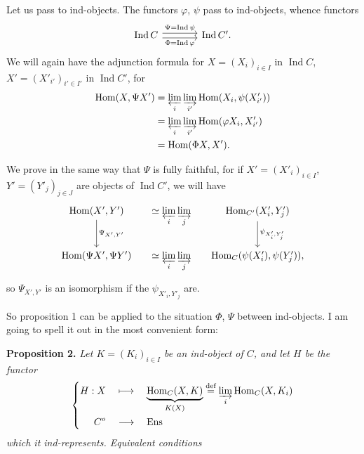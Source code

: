 \documentclass[11pt]{article}
\newcommand{\msp}[1]{\marginpar{\footnotesize [#1]}}
\newcommand{\Hom}{\operatorname{Hom}}
\newcommand{\Ind}{\operatorname{Ind}}
\newcommand{\Ens}{\mathrm{Ens}}
\begin{document}
Let us pass to ind-objects. The functors $\varphi$, $\psi$ pass to ind-objects, whence functors
\[
\begin{tikzcd}[column sep=large]
\Ind C \arrow[r,shift left,"\Psi = \Ind\psi"] \arrow[r,shift right,"\Phi = \Ind\varphi"'] & \Ind C'.
\end{tikzcd} %
\]
We will again have the adjunction formula for $X = (X_i)_{i\in I}$ in $\Ind C$, $X' = (X'_{i'})_{i'\in I'}$ in $\Ind C'$, for
\[
\begin{aligned}
\Hom(X,\Psi X') &= \varprojlim_i \varinjlim_{i'} \Hom(X_i,\psi(X'_{i'}))\\
&= \varprojlim_i \varinjlim_{i'} \Hom(\varphi X_i,X'_{i'})\\
&= \Hom(\Phi X,X').
\end{aligned}
\]

\noindent\msp{page 41}%
We prove in the same way that $\Psi$ is fully faithful, for if $X' = (X'_i)_{i\in I}$, $Y' = (Y'_j)_{j\in J}$ are objects of $\Ind C'$, we will have
\[
\begin{tikzcd}[column sep=small]
\Hom(X',Y') \arrow[d,"\Psi_{X',Y'}"] & \simeq \varprojlim\limits_i \varinjlim\limits_j & \Hom_{C'}(X'_i,Y'_j) \arrow[d,"\psi_{X'_i,Y'_j}"] \\
\Hom(\Psi X',\Psi Y') & \simeq \varprojlim\limits_i \varinjlim\limits_j & \Hom_C(\psi(X'_i),\psi(Y'_j)),
\end{tikzcd}
\]
so $\Psi_{X',Y'}$ is an isomorphism if the $\psi_{X'_i,Y'_j}$ are.

So proposition 1 can be applied to the situation $\Phi$, $\Psi$ between ind-objects. I am going to spell it out in the most convenient form:

\textbf{Proposition 2.} \textit{Let $K = (K_i)_{i\in I}$ be an ind-object of $C$, and let $H$ be the functor}
\[
\left\{
\begin{aligned}
H : X \quad &\longmapsto \quad \underbrace{\Hom_C(X,K)}_{K(X)} \overset{\text{def}}{=} \varinjlim_i \Hom_C(X,K_i)\\
C^o \quad &\longrightarrow \quad \Ens
\end{aligned}
\right.
\]
\textit{which it ind-represents. Equivalent conditions}
\end{document}
